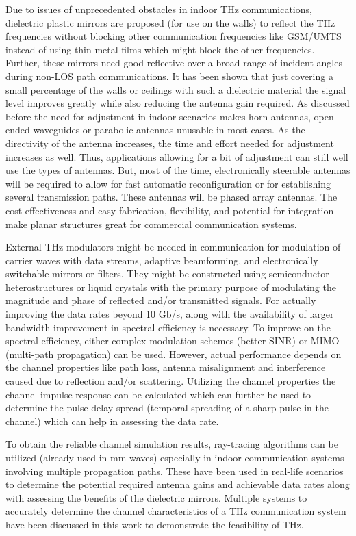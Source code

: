 \documentclass[12pt, letterpaper]{article}
\begin{document}
\par
Due to issues of unprecedented obstacles in indoor THz communications, dielectric plastic mirrors are proposed (for use on the walls) to reflect the THz frequencies without blocking other communication frequencies like GSM/UMTS instead of using thin metal films which might block the other frequencies. Further, these mirrors need good reflective over a broad range of incident angles during non-LOS path communications. It has been shown that just covering a small percentage of the walls or ceilings with such a dielectric material the signal level improves greatly while also reducing the antenna gain required. As discussed before the need for adjustment in indoor scenarios makes horn antennas, open-ended waveguides or parabolic antennas unusable in most cases. As the directivity of the antenna increases, the time and effort needed for adjustment increases as well. Thus, applications allowing for a bit of adjustment can still well use the types of antennas. But, most of the time, electronically steerable antennas will be required to allow for fast automatic reconfiguration or for establishing several transmission paths. These antennas will be phased array antennas. The cost-effectiveness and easy fabrication, flexibility, and potential for integration make planar structures great for commercial communication systems.
\par
External THz modulators might be needed in communication for modulation of carrier waves with data streams, adaptive beamforming, and electronically switchable mirrors or filters. They might be constructed using semiconductor heterostructures or liquid crystals with the primary purpose of modulating the magnitude and phase of reflected and/or transmitted signals. For actually improving the data rates beyond 10 Gb/s, along with the availability of larger bandwidth improvement in spectral efficiency is necessary. To improve on the spectral efficiency, either complex modulation schemes (better SINR) or MIMO (multi-path propagation) can be used. However, actual performance depends on the channel properties like path loss, antenna misalignment and interference caused due to reflection and/or scattering. Utilizing the channel properties the channel impulse response can be calculated which can further be used to determine the pulse delay spread (temporal spreading of a sharp pulse in the channel) which can help in assessing the data rate. 
\par
To obtain the reliable channel simulation results, ray-tracing algorithms can be utilized (already used in mm-waves) especially in indoor communication systems involving multiple propagation paths. These have been used in real-life scenarios to determine the potential required antenna gains and achievable data rates along with assessing the benefits of the dielectric mirrors. Multiple systems to accurately determine the channel characteristics of a THz communication system have been discussed in this work to demonstrate the feasibility of THz.
\end{document}
